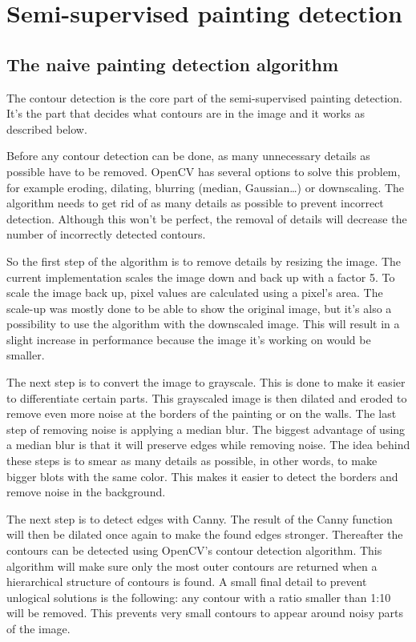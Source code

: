 \section{Semi-supervised painting detection}
\label{sec:assignment1}

\subsection{The naive painting detection algorithm}
\label{subsec:contour_detection}

The contour detection is the core part of the semi-supervised painting detection. It's the part that decides what contours are in the image and it works as described below.

Before any contour detection can be done, as many unnecessary details as possible have to be removed. OpenCV has several options to solve this problem, for example eroding, dilating, blurring (median, Gaussian\dots) or downscaling. The algorithm needs to get rid of as many details as possible to prevent incorrect detection. Although this won't be perfect, the removal of details will decrease the number of incorrectly detected contours.

So the first step of the algorithm is to remove details by resizing the image. The current implementation scales the image down and back up with a factor 5. To scale the image back up, pixel values are calculated using a pixel's area. The scale-up was mostly done to be able to show the original image, but it's also a possibility to use the algorithm with the downscaled image. This will result in a slight increase in performance because the image it's working on would be smaller.

The next step is to convert the image to grayscale. This is done to make it easier to differentiate certain parts. This grayscaled image is then dilated and eroded to remove even more noise at the borders of the painting or on the walls. The last step of removing noise is applying a median blur. The biggest advantage of using a median blur is that it will preserve edges while removing noise. The idea behind these steps is to smear as many details as possible, in other words, to make bigger blots with the same color. This makes it easier to detect the borders and remove noise in the background.

The next step is to detect edges with Canny. The result of the Canny function will then be dilated once again to make the found edges stronger. Thereafter the contours can be detected using OpenCV's contour detection algorithm. This algorithm will make sure only the most outer contours are returned when a hierarchical structure of contours is found. A small final detail to prevent unlogical solutions is the following: any contour with a ratio smaller than 1:10 will be removed. This prevents very small contours to appear around noisy parts of the image.


